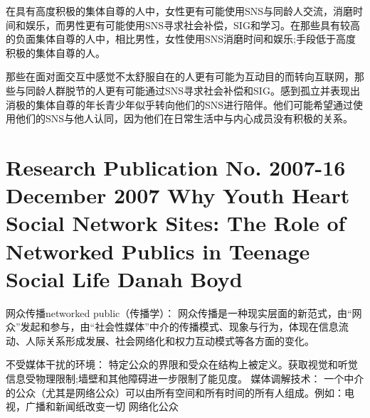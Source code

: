 在具有高度积极的集体自尊的人中，女性更有可能使用SNS与同龄人交流，消磨时间和娱乐，而男性更有可能使用SNS寻求社会补偿，SIG和学习。在那些具有较高的负面集体自尊的人中，相比男性，女性使用SNS消磨时间和娱乐;手段低于高度积极的集体自尊的人。

那些在面对面交互中感觉不太舒服自在的人更有可能为互动目的而转向互联网，那些与同龄人群脱节的人更有可能通过SNS寻求社会补偿和SIG。感到孤立并表现出消极的集体自尊的年长青少年似乎转向他们的SNS进行陪伴。他们可能希望通过使用他们的SNS与他人认同，因为他们在日常生活中与内心成员没有积极的关系。

\section*{Research Publication No. 2007-16 December 2007 
      Why Youth Heart Social Network Sites:  The Role of Networked Publics in Teenage Social Life 
Danah Boyd}

网众传播networked public（传播学）： 网众传播是一种现实层面的新范式，由“网众”发起和参与，由“社会性媒体”中介的传播模式、现象与行为，体现在信息流动、人际关系形成发展、社会网络化和权力互动模式等各方面的变化。

不受媒体干扰的环境：
特定公众的界限和受众在结构上被定义。获取视觉和听觉信息受物理限制;墙壁和其他障碍进一步限制了能见度。
媒体调解技术：
一个中介的公众（尤其是网络公众）可以由所有空间和所有时间的所有人组成。例如：电视，广播和新闻纸改变一切
网络化公众

